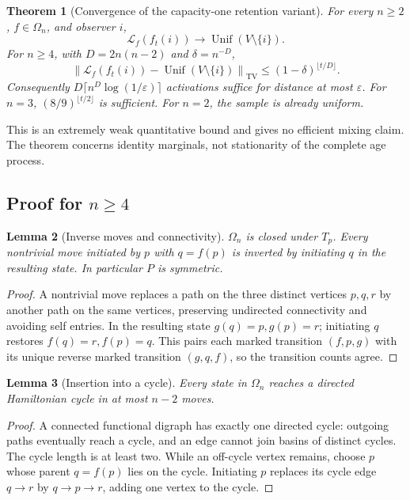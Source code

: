 \documentclass[11pt]{article}
\newtheorem{theorem}{Theorem}
\newtheorem{lemma}[theorem]{Lemma}
\newcommand{\TV}{\mathrm{TV}}
\newcommand{\Unif}{\operatorname{Unif}}
\newcommand{\Law}{\mathcal L}
\begin{document}
\begin{theorem}[Convergence of the capacity-one retention variant]
\label{thm:positive}
For every $n\ge2$, $f\in\Omega_n$, and observer $i$,
\[
 \Law_f(f_t(i))\longrightarrow\Unif(V\setminus\{i\}).
\]
For $n\ge4$, with $D=2n(n-2)$ and $\delta=n^{-D}$,
\begin{equation}
 \left\|\Law_f(f_t(i))-\Unif(V\setminus\{i\})\right\|_{\TV}
 \le(1-\delta)^{\lfloor t/D\rfloor}.
 \label{eq:positive}
\end{equation}
Consequently $D\lceil n^D\log(1/\varepsilon)\rceil$ activations
suffice for distance at most $\varepsilon$.
For $n=3$, $(8/9)^{\lfloor t/2\rfloor}$ is sufficient.
For $n=2$, the sample is already uniform.
\end{theorem}
This is an extremely weak quantitative bound and gives no efficient
mixing claim. The theorem concerns identity marginals, not stationarity
of the complete age process.

\subsection{Proof for \texorpdfstring{$n\ge4$}{n >= 4}}

\begin{lemma}[Inverse moves and connectivity]
\label{lem:inverse}
$\Omega_n$ is closed under $T_p$. Every nontrivial move initiated
by $p$ with $q=f(p)$ is inverted by initiating $q$ in the resulting
state. In particular $P$ is symmetric.
\end{lemma}
\begin{proof}
A nontrivial move replaces a path on the three distinct vertices
$p,q,r$ by another path on the same vertices, preserving undirected
connectivity and avoiding self entries. In the resulting state
$g(q)=p,g(p)=r$; initiating $q$ restores $f(q)=r,f(p)=q$.
This pairs each marked transition $(f,p,g)$ with its unique reverse
marked transition $(g,q,f)$, so the transition counts agree.
\end{proof}

\begin{lemma}[Insertion into a cycle]
\label{lem:insert}
Every state in $\Omega_n$ reaches a directed Hamiltonian cycle in at
most $n-2$ moves.
\end{lemma}
\begin{proof}
A connected functional digraph has exactly one directed cycle:
outgoing paths eventually reach a cycle, and an edge cannot join
basins of distinct cycles. The cycle length is at least two.
While an off-cycle vertex remains, choose $p$ whose parent $q=f(p)$
lies on the cycle. Initiating $p$ replaces its cycle edge $q\to r$
by $q\to p\to r$, adding one vertex to the cycle.
\end{proof}
\end{document}
